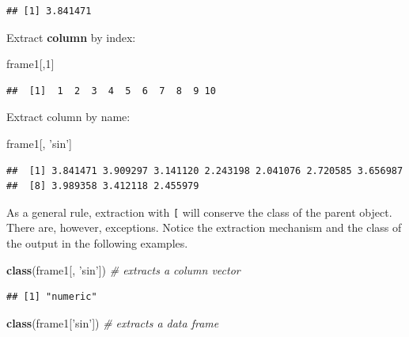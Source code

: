 \documentclass[]{book}
\newenvironment{Shaded}{\begin{snugshade}}{\end{snugshade}}
\newcommand{\KeywordTok}[1]{\textcolor[rgb]{0.13,0.29,0.53}{\textbf{#1}}}
\newcommand{\DecValTok}[1]{\textcolor[rgb]{0.00,0.00,0.81}{#1}}
\newcommand{\StringTok}[1]{\textcolor[rgb]{0.31,0.60,0.02}{#1}}
\newcommand{\CommentTok}[1]{\textcolor[rgb]{0.56,0.35,0.01}{\textit{#1}}}
\newcommand{\NormalTok}[1]{#1}
\theoremstyle{definition}
\theoremstyle{definition}
\theoremstyle{definition}
\theoremstyle{remark}
\begin{document}
\begin{verbatim}
## [1] 3.841471
\end{verbatim}

Extract \textbf{column} by index:

\begin{Shaded}
\begin{Highlighting}[]
\NormalTok{frame1[,}\DecValTok{1}\NormalTok{]                              }
\end{Highlighting}
\end{Shaded}

\begin{verbatim}
##  [1]  1  2  3  4  5  6  7  8  9 10
\end{verbatim}

Extract column by name:

\begin{Shaded}
\begin{Highlighting}[]
\NormalTok{frame1[, }\StringTok{'sin'}\NormalTok{]}
\end{Highlighting}
\end{Shaded}

\begin{verbatim}
##  [1] 3.841471 3.909297 3.141120 2.243198 2.041076 2.720585 3.656987
##  [8] 3.989358 3.412118 2.455979
\end{verbatim}

As a general rule, extraction with \texttt{{[}} will conserve the class
of the parent object. There are, however, exceptions. Notice the
extraction mechanism and the class of the output in the following
examples.

\begin{Shaded}
\begin{Highlighting}[]
\KeywordTok{class}\NormalTok{(frame1[, }\StringTok{'sin'}\NormalTok{])  }\CommentTok{# extracts a column vector}
\end{Highlighting}
\end{Shaded}

\begin{verbatim}
## [1] "numeric"
\end{verbatim}

\begin{Shaded}
\begin{Highlighting}[]
\KeywordTok{class}\NormalTok{(frame1[}\StringTok{'sin'}\NormalTok{])  }\CommentTok{# extracts a data frame}
\end{Highlighting}
\end{Shaded}
\end{document}

